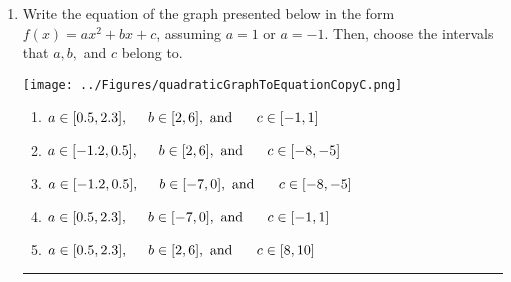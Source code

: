 \documentclass[14pt]{extbook}
\newcommand{\litem}[1]{\item#1\hspace*{-1cm}\rule{\textwidth}{0.4pt}}
\begin{document}
\begin{enumerate}
{\begin{enumerate}[label=\Alph*.]
\end{enumerate} }
\litem{
Write the equation of the graph presented below in the form $f(x)=ax^2+bx+c$, assuming  $a=1$ or $a=-1$. Then, choose the intervals that $a, b,$ and $c$ belong to.
\begin{center}
    \texttt{[image: ../Figures/quadraticGraphToEquationCopyC.png]}
\end{center}
\begin{enumerate}[label=\Alph*.]
\item \( a \in [0.5, 2.3], \hspace*{5mm} b \in [2, 6], \text{ and } \hspace*{5mm} c \in [-1, 1] \)
\item \( a \in [-1.2, 0.5], \hspace*{5mm} b \in [2, 6], \text{ and } \hspace*{5mm} c \in [-8, -5] \)
\item \( a \in [-1.2, 0.5], \hspace*{5mm} b \in [-7, 0], \text{ and } \hspace*{5mm} c \in [-8, -5] \)
\item \( a \in [0.5, 2.3], \hspace*{5mm} b \in [-7, 0], \text{ and } \hspace*{5mm} c \in [-1, 1] \)
\item \( a \in [0.5, 2.3], \hspace*{5mm} b \in [2, 6], \text{ and } \hspace*{5mm} c \in [8, 10] \)

\end{enumerate} }
\end{enumerate}
\end{document}
